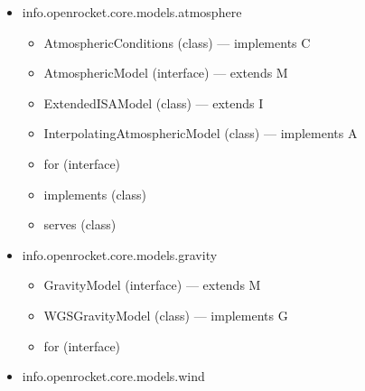 \documentclass{amsdtx}
\begin{document}
\begin{itemize}
\begin{itemize}
\begin{itemize}
    \item
      Bulk (class) --- extends M
    \item
      Custom (class) --- extends M
    \item
      Line (class) --- extends M
    \item
      Material (class) --- implements C
    \item
      MaterialGroup (class) --- implements C
    \item
      MaterialStorage (class) --- implements D
    \item
      Surface (class) --- extends M
    \item
      Type (enum)
    \item
      for (class)
    \item
      for (class)
    \item
      in (class)
    \end{itemize}
  \item
    info.openrocket.core.models.atmosphere

    \begin{itemize}
    
    \item
      AtmosphericConditions (class) --- implements C
    \item
      AtmosphericModel (interface) --- extends M
    \item
      ExtendedISAModel (class) --- extends I
    \item
      InterpolatingAtmosphericModel (class) --- implements A
    \item
      for (interface)
    \item
      implements (class)
    \item
      serves (class)
    \end{itemize}
  \item
    info.openrocket.core.models.gravity

    \begin{itemize}
    
    \item
      GravityModel (interface) --- extends M
    \item
      WGSGravityModel (class) --- implements G
    \item
      for (interface)
    \end{itemize}
  \item
    info.openrocket.core.models.wind

    \begin{itemize}
    

\end{itemize}
\end{itemize}
\end{itemize}
\end{document}
